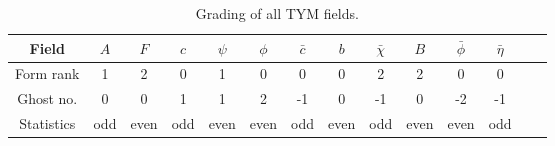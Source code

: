 \documentclass[../main/tex]{subfiles}
\begin{document}
\begin{table}[htpb]
  \caption{Grading of all TYM fields.}
  \label{tab:tym-grading}
  \begin{tabular}{cccccccccccccc}
    \toprule
    Field      & $A$ & $F$  & $c$ & $\psi$ & $\phi$ & $\bar{c}$ & $b$  & $\bar{\chi}$ & $B$  & $\bar{\phi}$ & $\bar{\eta}$ \\
    \midrule
    Form rank  & 1   & 2    & 0   & 1      & 0      & 0         & 0    & 2            & 2    & 0            & 0            \\
    Ghost no.  & 0   & 0    & 1   & 1      & 2      & -1        & 0    & -1           & 0    & -2           & -1           \\
    Statistics & odd & even & odd & even   & even   & odd       & even & odd          & even & even         & odd          \\
    \bottomrule
  \end{tabular}
\end{table}
\end{document}
